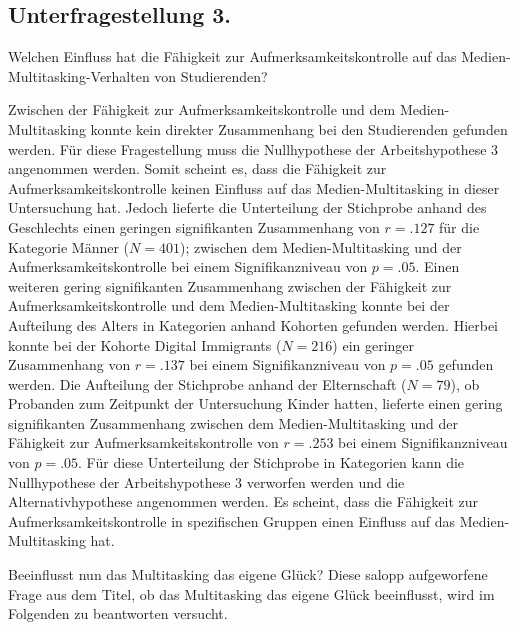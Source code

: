 \subsection{Unterfragestellung 3.} Welchen Einfluss hat die Fähigkeit zur Aufmerksamkeitskontrolle auf das Medien-Multitasking-Verhalten von Studierenden?

Zwischen der Fähigkeit zur Aufmerksamkeitskontrolle und dem Medien-Multitasking konnte kein direkter Zusammenhang bei den Studierenden gefunden werden. Für diese Fragestellung muss die Nullhypothese der Arbeitshypothese 3 angenommen werden. Somit scheint es, dass die Fähigkeit zur Aufmerksamkeitskontrolle keinen Einfluss auf das Medien-Multitasking in dieser Untersuchung hat. Jedoch lieferte die Unterteilung der Stichprobe anhand des Geschlechts einen geringen signifikanten Zusammenhang von $r=.127$ für die Kategorie Männer ($N=401$); zwischen dem Medien-Multitasking und der Aufmerksamkeitskontrolle bei einem Signifikanzniveau von $p=.05$. Einen weiteren gering signifikanten Zusammenhang zwischen der Fähigkeit zur Aufmerksamkeitskontrolle und dem Medien-Multitasking konnte bei der Aufteilung des Alters in Kategorien anhand Kohorten gefunden werden. Hierbei konnte bei der Kohorte Digital Immigrants ($N=216$) ein geringer Zusammenhang von $r=.137$ bei einem Signifikanzniveau von $p=.05$ gefunden werden. Die Aufteilung der Stichprobe anhand der Elternschaft ($N=79$), ob Probanden zum Zeitpunkt der Untersuchung Kinder hatten, lieferte einen gering signifikanten Zusammenhang zwischen dem Medien-Multitasking und der Fähigkeit zur Aufmerksamkeitskontrolle von $r=.253$ bei einem Signifikanzniveau von $p=.05$. Für diese Unterteilung der Stichprobe in Kategorien kann die Nullhypothese der Arbeitshypothese 3 verworfen werden und die Alternativhypothese angenommen werden. Es scheint, dass die Fähigkeit zur Aufmerksamkeitskontrolle in spezifischen Gruppen einen Einfluss auf das Medien-Multitasking hat.

\label{section.diskussion.interpretation}
Beeinflusst nun das Multitasking das eigene Glück? Diese salopp aufgeworfene Frage aus dem Titel, ob das Multitasking das eigene Glück beeinflusst, wird im Folgenden zu beantworten versucht.
 
